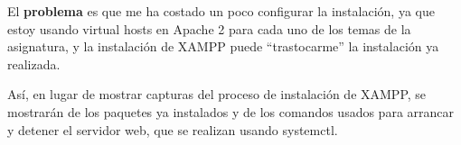 El \textbf{problema }es que me ha costado un poco configurar la instalación, ya que estoy usando virtual hosts en Apache 2 para cada uno de los temas de la asignatura, y la instalación de XAMPP puede ``trastocarme'' la instalación ya realizada.

Así, en lugar de mostrar capturas del proceso de instalación de XAMPP, se mostrarán de los paquetes ya instalados y de los comandos usados para arrancar y detener el servidor web, que se realizan usando systemctl.




%
%

